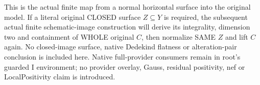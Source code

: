 This is the actual finite map from a normal horizontal surface into the
original model. If a literal original CLOSED surface $Z\subseteq Y$ is
required, the subsequent actual finite schematic-image construction
will derive its integrality, dimension two and containment of WHOLE
original $C$, then normalize SAME $Z$ and lift $C$ again. No closed-image
surface, native Dedekind flatness or alteration-pair conclusion is
included here. Native full-provider consumers remain in root's guarded
I environment; no provider overlay, Gauss, residual positivity, nef or
LocalPositivity claim is introduced.
